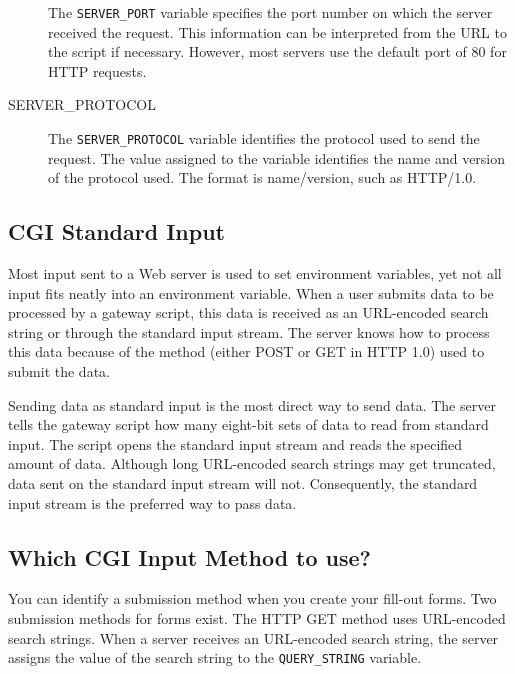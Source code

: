 \begin{description}
The \verb|SERVER_PORT| variable specifies the port number on which the server received
the request. This information can be interpreted from the URL to the script if
necessary. However, most servers use the default port of 80 for HTTP requests.

\item[SERVER\_PROTOCOL]

The \verb|SERVER_PROTOCOL| variable identifies the protocol used to send the
request. The value assigned to the variable identifies the name and
version of the protocol used. The format is name/version, such as
HTTP/1.0. 

%

\end{description}

\subsection{CGI Standard Input}

Most input sent to a Web server is used to set environment variables, yet
not all input fits neatly into an environment variable. When a user
submits data to be processed by a gateway script, this data is received as
an URL-encoded search string or through the standard input stream. The
server knows how to process this data because of the method (either POST
or GET in HTTP 1.0) used to submit the data.

Sending data as standard input is the most direct way to send data. The
server tells the gateway script how many eight-bit sets of data to read
from standard input. The script opens the standard input stream and reads
the specified amount of data. Although long URL-encoded search strings may
get truncated, data sent on the standard input stream will not.
Consequently, the standard input stream is the preferred way to pass data.

\subsection{Which CGI Input Method to use?}

You can identify a submission method when you create your fill-out forms.
Two submission methods for forms exist. The HTTP GET
method uses URL-encoded search strings. When a server receives an
URL-encoded search string, the server assigns the value of the search
string to the \verb|QUERY_STRING| variable.


